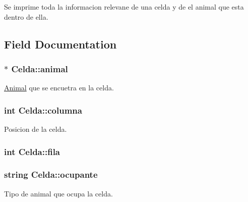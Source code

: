 Se imprime toda la informacion relevane de una celda y de el animal que esta dentro de ella. 



\subsection{Field Documentation}
\subsubsection[{\texorpdfstring{animal}{animal}}]{$\ast$ Celda\+::animal}\hypertarget{classCelda_a57f99719090f3f2cc587ca5ea89d6f7d}{}\label{classCelda_a57f99719090f3f2cc587ca5ea89d6f7d}


\hyperlink{classAnimal}{Animal} que se encuetra en la celda. 

\subsubsection[{\texorpdfstring{columna}{columna}}]{\setlength{\rightskip}{0pt plus 5cm}int Celda\+::columna}\hypertarget{classCelda_a5f93fabd067087b5679e6226c7eb4313}{}\label{classCelda_a5f93fabd067087b5679e6226c7eb4313}


Posicion de la celda. 

\subsubsection[{\texorpdfstring{fila}{fila}}]{\setlength{\rightskip}{0pt plus 5cm}int Celda\+::fila}\hypertarget{classCelda_a58bd35cc52cc550b75a33cdaccdd014b}{}\label{classCelda_a58bd35cc52cc550b75a33cdaccdd014b}
\subsubsection[{\texorpdfstring{ocupante}{ocupante}}]{\setlength{\rightskip}{0pt plus 5cm}string Celda\+::ocupante}\hypertarget{classCelda_aa9893b7aca0260a6305a8756971c1a53}{}\label{classCelda_aa9893b7aca0260a6305a8756971c1a53}


Tipo de animal que ocupa la celda. 

